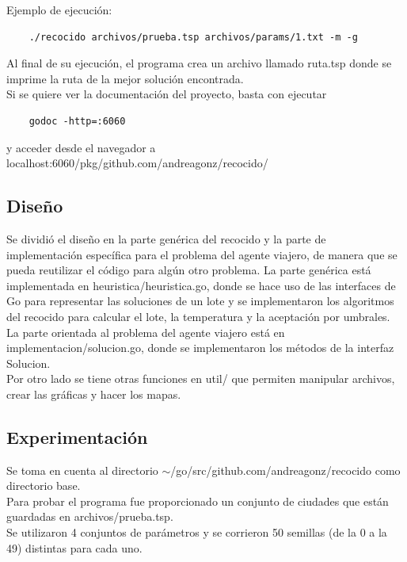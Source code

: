 \documentclass[12pt]{article}
\begin{document}
Ejemplo de ejecución: 
\begin{verbatim}
    ./recocido archivos/prueba.tsp archivos/params/1.txt -m -g
\end{verbatim}

Al final de su ejecución, el programa crea un archivo llamado \textsf{ruta.tsp} donde se imprime la ruta de la mejor solución encontrada. \\

Si se quiere ver la documentación del proyecto, basta con ejecutar
\begin{verbatim}
    godoc -http=:6060
\end{verbatim}
y acceder desde el navegador a \textsf{localhost:6060/pkg/github.com/andreagonz/recocido/}

\newpage

\subsection{Diseño}
Se dividió el diseño en la parte genérica del recocido y la parte de implementación específica para el problema del agente viajero, de manera que se pueda reutilizar el código para algún otro problema. La parte genérica está implementada en \textsf{heuristica/heuristica.go}, donde se hace uso de las interfaces de Go para representar las soluciones de un lote y se implementaron los algoritmos del recocido para calcular el lote, la temperatura y la aceptación por umbrales. La parte orientada al problema del agente viajero está en \textsf{implementacion/solucion.go}, donde se implementaron los métodos de la interfaz \textsf{Solucion}. \\

Por otro lado se tiene otras funciones en \textsf{util/} que permiten manipular archivos, crear las gráficas y hacer los mapas.

\subsection{Experimentación}
Se toma en cuenta al directorio \textsf{$\sim$/go/src/github.com/andreagonz/recocido} como directorio base. \\
Para probar el programa fue proporcionado un conjunto de ciudades que están guardadas en \textsf{archivos/prueba.tsp}. \\

Se utilizaron 4 conjuntos de parámetros y se corrieron 50 semillas (de la 0 a la 49) distintas para cada uno.
\end{document}
